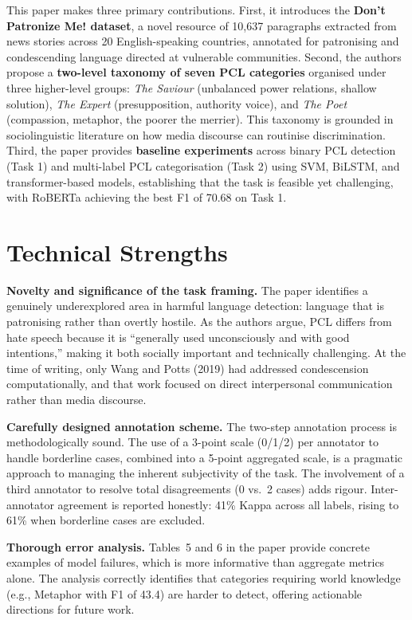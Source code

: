 \documentclass[12pt,twoside]{report}
\begin{document}
This paper makes three primary contributions. First, it introduces the \textbf{Don't Patronize Me! dataset}, a novel resource of 10,637 paragraphs extracted from news stories across 20 English-speaking countries, annotated for patronising and condescending language directed at vulnerable communities. Second, the authors propose a \textbf{two-level taxonomy of seven PCL categories} organised under three higher-level groups: \textit{The Saviour} (unbalanced power relations, shallow solution), \textit{The Expert} (presupposition, authority voice), and \textit{The Poet} (compassion, metaphor, the poorer the merrier). This taxonomy is grounded in sociolinguistic literature on how media discourse can routinise discrimination. Third, the paper provides \textbf{baseline experiments} across binary PCL detection (Task 1) and multi-label PCL categorisation (Task 2) using SVM, BiLSTM, and transformer-based models, establishing that the task is feasible yet challenging, with RoBERTa achieving the best F1 of 70.68 on Task 1.

\section{Technical Strengths}

\textbf{Novelty and significance of the task framing.} The paper identifies a genuinely underexplored area in harmful language detection: language that is patronising rather than overtly hostile. As the authors argue, PCL differs from hate speech because it is ``generally used unconsciously and with good intentions,'' making it both socially important and technically challenging. At the time of writing, only Wang and Potts (2019) had addressed condescension computationally, and that work focused on direct interpersonal communication rather than media discourse.

\textbf{Carefully designed annotation scheme.} The two-step annotation process is methodologically sound. The use of a 3-point scale (0/1/2) per annotator to handle borderline cases, combined into a 5-point aggregated scale, is a pragmatic approach to managing the inherent subjectivity of the task. The involvement of a third annotator to resolve total disagreements (0 vs.\ 2 cases) adds rigour. Inter-annotator agreement is reported honestly: 41\% Kappa across all labels, rising to 61\% when borderline cases are excluded.

\textbf{Thorough error analysis.} Tables~5 and 6 in the paper provide concrete examples of model failures, which is more informative than aggregate metrics alone. The analysis correctly identifies that categories requiring world knowledge (e.g., Metaphor with F1 of 43.4) are harder to detect, offering actionable directions for future work.
\end{document}

